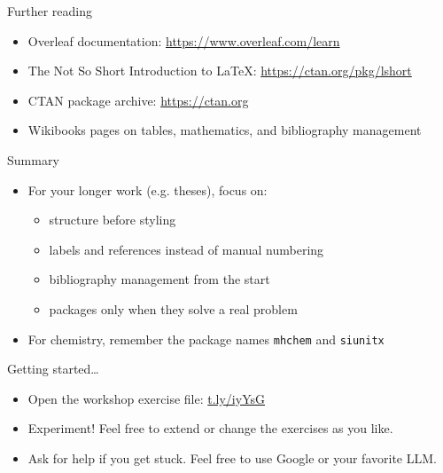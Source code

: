 \documentclass{beamer}
\begin{document}
\begin{frame}{Further reading}
    \begin{itemize}
        \item Overleaf documentation: \url{https://www.overleaf.com/learn}
        \item The Not So Short Introduction to \LaTeX{}:
              \url{https://ctan.org/pkg/lshort}
        \item CTAN package archive: \url{https://ctan.org}
        \item Wikibooks pages on tables, mathematics, and bibliography management
    \end{itemize}
\end{frame}

\begin{frame}{Summary}
    \begin{itemize}
        \item For your longer work (e.g. theses), focus on:
              \begin{itemize}
                  \item structure before styling
                  \item labels and references instead of manual numbering
                  \item bibliography management from the start
                  \item packages only when they solve a real problem
              \end{itemize}
        \item For chemistry, remember the package names
              \texttt{mhchem} and \texttt{siunitx}
    \end{itemize}
\end{frame}

\begin{frame}{Getting started\ldots}
    \begin{itemize}
        \item Open the workshop exercise file: \url{t.ly/iyYsG}
        \item Experiment! Feel free to extend or change the exercises as you like.
        \item Ask for help if you get stuck. Feel free to use Google or your favorite LLM.
    \end{itemize}
\end{frame}
\end{document}
